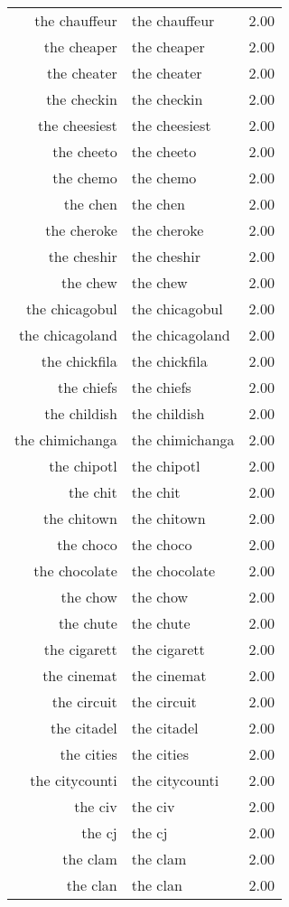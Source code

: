 \begin{table}[ht]
\begin{tabular}{rlr}
  the chauffeur & the chauffeur & 2.00 \\ 
  the cheaper & the cheaper & 2.00 \\ 
  the cheater & the cheater & 2.00 \\ 
  the checkin & the checkin & 2.00 \\ 
  the cheesiest & the cheesiest & 2.00 \\ 
  the cheeto & the cheeto & 2.00 \\ 
  the chemo & the chemo & 2.00 \\ 
  the chen & the chen & 2.00 \\ 
  the cheroke & the cheroke & 2.00 \\ 
  the cheshir & the cheshir & 2.00 \\ 
  the chew & the chew & 2.00 \\ 
  the chicagobul & the chicagobul & 2.00 \\ 
  the chicagoland & the chicagoland & 2.00 \\ 
  the chickfila & the chickfila & 2.00 \\ 
  the chiefs & the chiefs & 2.00 \\ 
  the childish & the childish & 2.00 \\ 
  the chimichanga & the chimichanga & 2.00 \\ 
  the chipotl & the chipotl & 2.00 \\ 
  the chit & the chit & 2.00 \\ 
  the chitown & the chitown & 2.00 \\ 
  the choco & the choco & 2.00 \\ 
  the chocolate & the chocolate & 2.00 \\ 
  the chow & the chow & 2.00 \\ 
  the chute & the chute & 2.00 \\ 
  the cigarett & the cigarett & 2.00 \\ 
  the cinemat & the cinemat & 2.00 \\ 
  the circuit & the circuit & 2.00 \\ 
  the citadel & the citadel & 2.00 \\ 
  the cities & the cities & 2.00 \\ 
  the citycounti & the citycounti & 2.00 \\ 
  the civ & the civ & 2.00 \\ 
  the cj & the cj & 2.00 \\ 
  the clam & the clam & 2.00 \\ 
  the clan & the clan & 2.00 \\ 

\end{tabular}
\end{table}
